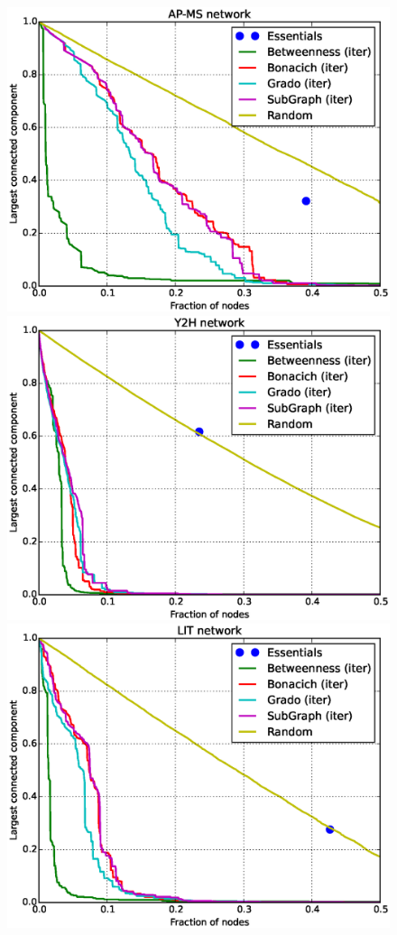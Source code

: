 \begin{figure}
\centering
\includegraphics[scale = 0.3]{figuras/AP-MS} 
\includegraphics[scale = 0.3]{figuras/Y2H} \\
\includegraphics[scale = 0.3]{figuras/LIT} 

\end{figure}
